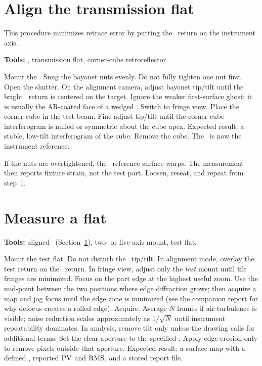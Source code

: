 \section{Align the transmission flat}
\label{sec:align-tf}

This procedure minimizes retrace error by putting the \TF\ return on the instrument axis.

\textbf{Tools:} \instrument, transmission flat, corner-cube retroreflector.

\resetsteps
\stepn Mount the \TF. Snug the bayonet nuts evenly. Do not fully tighten one nut first.
\stepn Open the shutter. On the alignment camera, adjust bayonet tip/tilt until the bright \TF\ return is centered on the target.
\stepn Ignore the weaker first-surface ghost; it is usually the AR-coated face of a wedged \TF.
\stepn Switch to fringe view. Place the corner cube in the test beam.
\stepn Fine-adjust tip/tilt until the corner-cube interferogram is nulled or symmetric about the cube apex.
\stepn Expected result: a stable, low-tilt interferogram of the cube. Remove the cube. The \TF\ is now the instrument reference.

\begin{cautionbox}
If the nuts are overtightened, the \TF\ reference surface warps. The measurement then reports fixture strain, not the test part. Loosen, reseat, and repeat from step~1.
\end{cautionbox}

\section{Measure a flat}

\textbf{Tools:} aligned \TF\ (Section~\ref{sec:align-tf}), two- or five-axis mount, test flat.

\resetsteps
\stepn Mount the test flat. Do not disturb the \TF\ tip/tilt.
\stepn In alignment mode, overlay the test return on the \TF\ return.
\stepn In fringe view, adjust only the \emph{test} mount until tilt fringes are minimized.
\stepn Focus on the part edge at the highest useful zoom. Use the mid-point between the two positions where edge diffraction grows; then acquire a map and jog focus until the edge zone is minimized (see the companion report for why defocus creates a rolled edge).
\stepn Acquire. Average \(N\) frames if air turbulence is visible; noise reduction scales approximately as \(1/\sqrt{N}\) until instrument repeatability dominates.
\stepn In analysis, remove tilt only unless the drawing calls for additional terms. Set the clear aperture to the specified \CA. Apply edge erosion only to remove pixels outside that aperture.
\stepn Expected result: a surface map with a defined \CA, reported \(\mathrm{PV}\) and \(\mathrm{RMS}\), and a stored report file.

